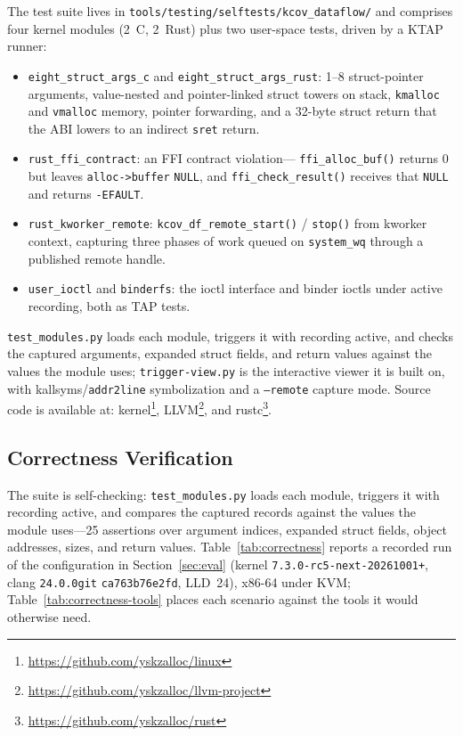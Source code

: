 \documentclass{article}
\begin{document}
The test suite lives in \texttt{tools/testing/selftests/kcov\_dataflow/} and
comprises four kernel modules (2~C, 2~Rust) plus two user-space tests, driven
by a KTAP runner:
\begin{itemize}[nosep]
  \item \texttt{eight\_struct\_args\_c} and
        \texttt{eight\_struct\_args\_rust}: 1--8 struct-pointer arguments,
        value-nested and pointer-linked struct towers on stack,
        \texttt{kmalloc} and \texttt{vmalloc} memory, pointer forwarding, and
        a 32-byte struct return that the ABI lowers to an indirect
        \texttt{sret} return.
  \item \texttt{rust\_ffi\_contract}: an FFI contract violation---
        \texttt{ffi\_alloc\_buf()} returns 0 but leaves
        \texttt{alloc->buffer} \texttt{NULL}, and \texttt{ffi\_check\_result()}
        receives that \texttt{NULL} and returns \texttt{-EFAULT}.
  \item \texttt{rust\_kworker\_remote}: \texttt{kcov\_df\_remote\_start()} /
        \texttt{stop()} from kworker context, capturing three phases of work
        queued on \texttt{system\_wq} through a published remote handle.
  \item \texttt{user\_ioctl} and \texttt{binderfs}: the ioctl interface and
        binder ioctls under active recording, both as TAP tests.
\end{itemize}
\texttt{test\_modules.py} loads each module, triggers it with recording
active, and checks the captured arguments, expanded struct fields, and return
values against the values the module uses; \texttt{trigger-view.py} is the
interactive viewer it is built on, with kallsyms/\texttt{addr2line}
symbolization and a \texttt{--remote} capture mode.
Source code is available at:
kernel\footnote{\url{https://github.com/yskzalloc/linux}},
LLVM\footnote{\url{https://github.com/yskzalloc/llvm-project}}, and
rustc\footnote{\url{https://github.com/yskzalloc/rust}}.

\subsection{Correctness Verification}

The suite is self-checking: \texttt{test\_modules.py} loads each module,
triggers it with recording active, and compares the captured records against
the values the module uses---25 assertions over argument indices, expanded
struct fields, object addresses, sizes, and return values.
Table~\ref{tab:correctness} reports a recorded run of the configuration in
Section~\ref{sec:eval} (kernel
\texttt{7.3.0-rc5-next-20261001+}, clang \texttt{24.0.0git}
\texttt{ca763b76e2fd}, LLD~24), x86-64 under KVM; Table~\ref{tab:correctness-tools}
places each scenario against the tools it would otherwise need.
\end{document}
